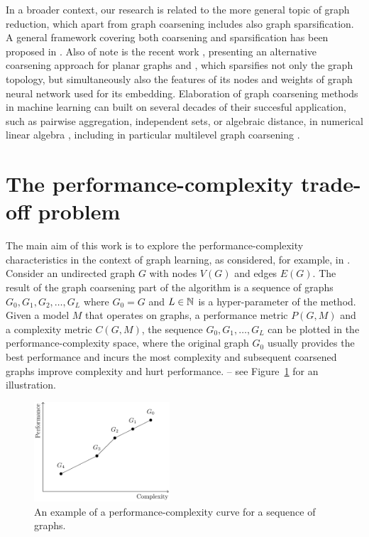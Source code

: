 \documentclass[sn-mathphys,pdflatex,iicol]{sn-jnl}%
\newcommand{\mathfield}{\ensuremath{\mathbb}}
\begin{document}
In a broader context, our research is related to the more general topic of graph reduction, which apart from graph coarsening includes also graph sparsification. A general framework covering both coarsening and sparsification has been proposed in \cite{bravo_hermsdorff_unifying_2019}. Also of note is the recent work \cite{kammer_space-efficient_2022}, presenting an alternative coarsening approach for planar graphs and \cite{liu_comprehensive_2022}, which sparsifies not only the graph topology, but simultaneously also the features of its nodes and weights of graph neural network used for its embedding. Elaboration of graph coarsening methods in machine learning can built on several decades of their succesful application, such as pairwise aggregation, independent sets, or algebraic distance, in numerical linear algebra \cite{chen_graph_2022}, including in particular multilevel graph coarsening \cite{osei-kuffuor_matrix_2015, ubaru_sampling_2019}.

\section{The performance-complexity trade-off problem}\label{sec:performance-complexity}

The main aim of this work is to explore the performance-complexity characteristics in the context of graph learning, as considered, for example, in \cite{prochazka_downstream_2022}. Consider an undirected graph \( G \) with nodes \( V \left( G \right) \) and edges \( E \left( G \right) \). The result of the graph coarsening part of the algorithm is a sequence of graphs \( G_0, G_1, G_2, \dots, G_L \) where \( G_0 = G \) and \( L \in \mathfield{N} \) is a hyper-parameter of the method.
Given a model \( M \) that operates on graphs, a performance metric \( P \left( G, M \right) \) and a complexity metric \( C \left( G, M \right) \), the sequence \( G_0, G_1, \dots, G_L \) can be plotted in the performance-complexity space, where the original graph \( G_0 \) usually provides the best performance and incurs the most complexity and subsequent coarsened graphs improve complexity and hurt performance. -- see Figure~\ref{fig:performance-complexity} for an illustration.

\begin{figure}
  \centering
  \includegraphics[width=0.45\textwidth]{performance-complexity.pdf}
  \caption{An example of a performance-complexity curve for a sequence of graphs.}
  \label{fig:performance-complexity}
\end{figure}
\end{document}
